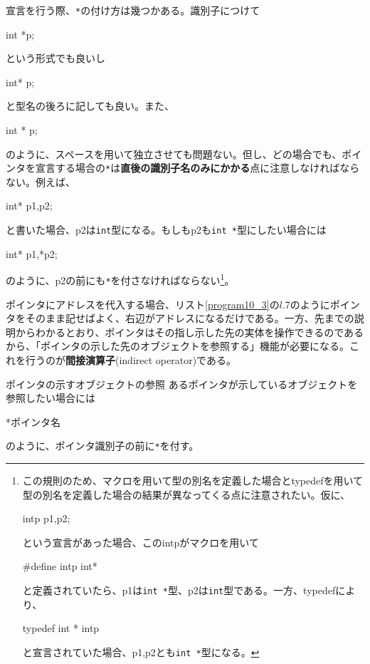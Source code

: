 宣言を行う際、\verb|*|の付け方は幾つかある。識別子につけて
\begin{code}
int *p;
\end{code}
という形式でも良いし
\begin{code}
int* p;
\end{code}
と型名の後ろに記しても良い。また、
\begin{code}
int * p;
\end{code}
のように、スペースを用いて独立させても問題ない。但し、どの場合でも、ポインタを宣言する場合の\verb|*|は\textbf{直後の識別子名のみにかかる}点に注意しなければならない。例えば、
\begin{code}
int* p1,p2;
\end{code}
と書いた場合、p2は\verb|int|型になる。もしもp2も\verb|int *|型にしたい場合には
\begin{code}
int* p1,*p2;
\end{code}
のように、p2の前にも\verb|*|を付さなければならない\footnote{この規則のため、マクロを用いて型の別名を定義した場合とtypedefを用いて型の別名を定義した場合の結果が異なってくる点に注意されたい。仮に、
\begin{code}
intp p1,p2;
\end{code}
という宣言があった場合、このintpがマクロを用いて
\begin{code}
#define intp int*
\end{code}
と定義されていたら、p1は\verb|int *|型、p2は\verb|int|型である。一方、typedefにより、
\begin{code}
typedef int * intp
\end{code}
と宣言されていた場合、p1,p2とも\verb|int *|型になる。}。

ポインタにアドレスを代入する場合、リスト\ref{program10_3}の$l$.7のようにポインタをそのまま記せばよく、右辺がアドレスになるだけである。一方、先までの説明からわかるとおり、ポインタはその指し示した先の実体を操作できるのであるから、「ポインタの示した先のオブジェクトを参照する」機能が必要になる。これを行うのが\textbf{間接演算子}(indirect operator)である。
\begin{itembox}[l]{ポインタの示すオブジェクトの参照}
あるポインタが示しているオブジェクトを参照したい場合には
\begin{code}
*ポインタ名
\end{code}
のように、ポインタ識別子の前に\verb|*|を付す。
\end{itembox}

